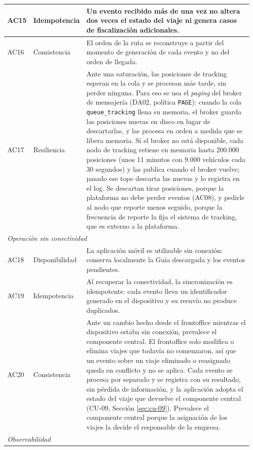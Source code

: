 \begin{longtable}{|p{1.3cm}|p{2.7cm}|p{11.5cm}|}
    \hline
    AC15 & Idempotencia & Un evento recibido más de una vez no altera dos veces el estado del viaje ni genera casos de fiscalización adicionales. \\
    \hline
    AC16 & Consistencia & El orden de la ruta se reconstruye a partir del momento de generación de cada evento y no del orden de llegada. \\
    \hline
    AC17 & Resiliencia & Ante una saturación, las posiciones de tracking esperan en la cola y se procesan más tarde, sin perder ninguna. Para eso se usa el \emph{paging} del broker de mensajería (DA02, política \texttt{PAGE}): cuando la cola \texttt{queue\_tracking} llena su memoria, el broker guarda las posiciones nuevas en disco en lugar de descartarlas, y las procesa en orden a medida que se libera memoria. Si el broker no está disponible, cada nodo de tracking retiene en memoria hasta 200.000 posiciones (unos 11 minutos con 9.000 vehículos cada 30 segundos) y las publica cuando el broker vuelve; pasado ese tope descarta las nuevas y lo registra en el log. Se descartan tirar posiciones, porque la plataforma no debe perder eventos (AC08), y pedirle al nodo que reporte menos seguido, porque la frecuencia de reporte la fija el sistema de tracking, que es externo a la plataforma. \\
    \hline
    \multicolumn{3}{|l|}{\textit{Operación sin conectividad}} \\
    \hline
    AC18 & Disponibilidad & La aplicación móvil es utilizable sin conexión: conserva localmente la Guía descargada y los eventos pendientes. \\
    \hline
    AC19 & Idempotencia & Al recuperar la conectividad, la sincronización es idempotente: cada evento lleva un identificador generado en el dispositivo y su reenvío no produce duplicados. \\
    \hline
    AC20 & Consistencia & Ante un cambio hecho desde el frontoffice mientras el dispositivo estaba sin conexión, prevalece el componente central. El frontoffice solo modifica o elimina viajes que todavía no comenzaron, así que un evento sobre un viaje eliminado o reasignado queda en conflicto y no se aplica. Cada evento se procesa por separado y se registra con su resultado, sin pérdida de información, y la aplicación adopta el estado del viaje que devuelve el componente central (CU-09, Sección \ref{sec:cu-09}). Prevalece el componente central porque la asignación de los viajes la decide el responsable de la empresa. \\
    \hline
    \multicolumn{3}{|l|}{\textit{Observabilidad}} \\

\end{longtable}
